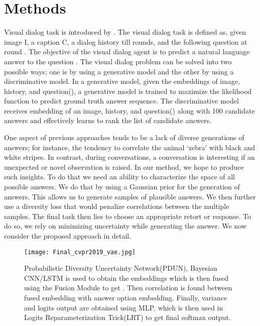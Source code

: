 \documentclass[review]{elsarticle}
\begin{document}
\section{Methods}
Visual dialog task is introduced by \cite{Das_CVPR2017}. The visual dialog task is defined as, given image I, a caption C, a dialog history till  rounds,  and the following question  at round . The objective of the visual dialog agent is to predict a natural language answer to the question . The visual dialog problem can be solved into two possible ways; one is by using a generative model and the other by using a discriminative model. In a generative model, given the embeddings of image, history, and question(), a generative model is trained to maximize the likelihood function to predict ground truth answer sequence. The discriminative model receives embedding of an image, history, and question() along with 100 candidate answers  and effectively learns to rank the list of candidate answers.

One aspect of previous approaches tends to be a lack of diverse generations of answers; for instance, the tendency to correlate the animal `zebra' with black and white stripes. In contrast, during conversations, a conversation is interesting if an unexpected or novel observation is raised. In our method, we hope to produce such insights. To do that we need an ability to characterize the space of all possible answers. We do that by using a Gaussian prior for the generation of answers. This allows us to generate samples of plausible answers. We then further use a diversity loss that would penalize correlations between the multiple samples. The final task then lies to choose an appropriate retort or response. To do so, we rely on minimizing uncertainty while generating the answer. We now consider the proposed approach in detail.




\begin{figure*}[ht]
	\centering
	\texttt{[image: Final\_cvpr2019\_vae.jpg]}
	\vspace{-2.4em}
	\caption{Probabilistic Diversity Uncertainty Network(PDUN), Bayesian CNN/LSTM is used to obtain the embeddings  which is then fused using the Fusion Module to get . Then correlation is found between fused embedding with answer option embedding. Finally, variance and logits output are obtained using MLP, which is then used in Logits Reparameterization Trick(LRT) to get final softmax output.}
\label{fig:main_figure}
\end{figure*}
\end{document}
